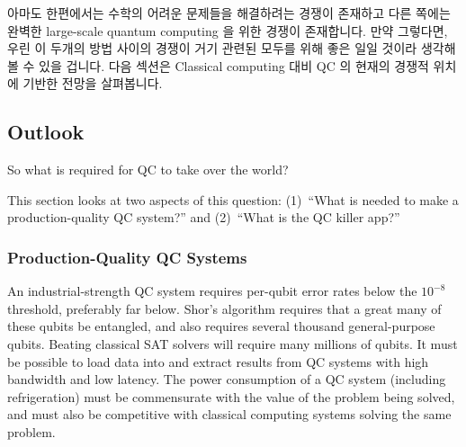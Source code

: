 아마도 한편에서는 수학의 어려운 문제들을 해결하려는 경쟁이 존재하고 다른 쪽에는
완벽한 large-scale quantum computing 을 위한 경쟁이 존재합니다.
만약 그렇다면, 우린 이 두개의 방법 사이의 경쟁이 거기 관련된 모두를 위해 좋은
일일 것이라 생각해 볼 수 있을 겁니다.
다음 섹션은 Classical computing 대비 QC 의 현재의 경쟁적 위치에 기반한 전망을
살펴봅니다.

\subsection{Outlook}
\label{sec:future:Outlook}

So what is required for QC to take over the world?

This section looks at two aspects of this question:
(1)~``What is needed to make a production-quality QC system?'' and
(2)~``What is the QC killer app?''

\subsubsection{Production-Quality QC Systems}
\label{sec:future:Production-Quality QC Systems}

An industrial-strength QC system requires per-qubit error rates below the
$10^{-8}$ threshold, preferably far below.
Shor's algorithm requires that a great many of these qubits be entangled,
and also requires several thousand general-purpose qubits.
Beating classical SAT solvers will require many millions of qubits.
It must be possible to load data into and extract results from QC
systems with high bandwidth and low latency.
The power consumption of a QC system (including refrigeration) must be
commensurate with the value of the problem being solved, and must also
be competitive with classical computing systems solving the same problem.

